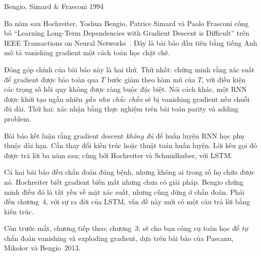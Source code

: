 \begin{bridge}{Bengio, Simard \& Frasconi 1994}
%

Ba năm sau Hochreiter, Yoshua Bengio, Patrice Simard và Paolo Frasconi công
bố \enquote{Learning Long-Term Dependencies with Gradient Descent is
Difficult} trên IEEE Transactions on Neural Networks~\autocite{bengio1994}.
Đây là bài báo đầu tiên bằng tiếng Anh mô tả vanishing gradient một cách
toán học chặt chẽ.

Đóng góp chính của bài báo này là hai thứ. Thứ nhất: chứng minh rằng xác
suất để gradient được bảo toàn qua $T$ bước giảm theo hàm mũ của $T$, với
điều kiện các trọng số hồi quy không được ràng buộc đặc biệt. Nói cách khác,
một RNN được khởi tạo ngẫu nhiên \emph{gần như chắc chắn} sẽ bị vanishing
gradient nếu chuỗi đủ dài. Thứ hai: xác nhận bằng thực nghiệm trên bài toán
parity và adding problem.

Bài báo kết luận rằng gradient descent \emph{không đủ} để huấn luyện RNN học
phụ thuộc dài hạn. Cần thay đổi kiến trúc hoặc thuật toán huấn luyện. Lời
kêu gọi đó được trả lời ba năm sau; cũng bởi Hochreiter và Schmidhuber, với
LSTM.

%
\end{bridge}

Cả hai bài báo đều chẩn đoán đúng bệnh, nhưng không ai trong số họ chữa được
nó. Hochreiter biết gradient biến mất nhưng chưa có giải pháp. Bengio chứng
minh điều đó là tất yếu về mặt xác suất, nhưng cũng dừng ở chẩn đoán. Phải
đến chương~4, với sự ra đời của LSTM, vấn đề này mới có một câu trả lời bằng
kiến trúc.

Còn trước mắt, chương tiếp theo; chương~3; sẽ cho bạn công cụ toán học để
\emph{tự} chẩn đoán vanishing và exploding gradient, dựa trên bài báo của
Pascanu, Mikolov và Bengio~2013.
